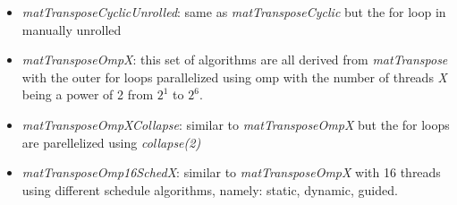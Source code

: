 \documentclass[conference]{IEEEtran}
\begin{document}
\begin{itemize}
\item \textit{matTransposeCyclicUnrolled}: same as \textit{matTransposeCyclic} but the for loop in manually unrolled

\item \textit{matTransposeOmpX}: this set of algorithms are all derived from \textit{matTranspose} with the outer for loops parallelized using omp with the number of threads \textit{X} being a power of 2 from $2^1$ to $2^6$.

\item \textit{matTransposeOmpXCollapse}: similar to \textit{matTransposeOmpX} but the for loops are parellelized using \textit{collapse(2)}
  
\item \textit{matTransposeOmp16SchedX}: similar to \textit{matTransposeOmpX} with 16 threads using different schedule algorithms, namely: static, dynamic, guided.
\end{itemize}
\end{document}
